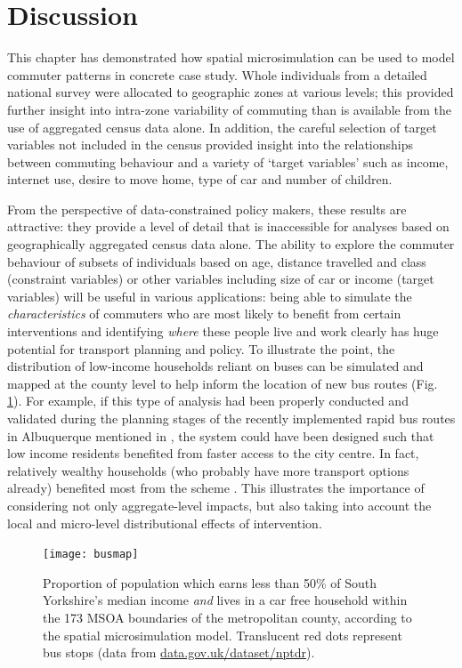 \section{Discussion}
\label{discuss-jtrg}
This chapter has demonstrated how spatial microsimulation can be
used to model commuter patterns in concrete case study.
Whole individuals from a detailed national survey were
allocated to geographic zones at various levels; this provided further insight
into intra-zone variability of commuting than is available from the use of
aggregated census data alone. In addition, the careful selection of target
variables not included in the census provided insight into the relationships
between commuting behaviour and a variety of `target variables' such as income,
internet use, desire to move home, type of car and number of children.

From the perspective of data-constrained policy makers, these results are attractive:
they provide a level of detail that is inaccessible for analyses
based on geographically aggregated census data alone. The ability
to explore the commuter behaviour of subsets of individuals based on age,
distance travelled and class (constraint variables) or other variables
including size of car or income (target variables) will be useful in
various applications:
being able to simulate the \emph{characteristics} of commuters who are most
likely to benefit from certain interventions and identifying \emph{where} these
people live and work clearly has huge potential for transport planning and policy.
To illustrate the point, the
distribution of low-income households reliant on buses can be simulated and mapped
at the county level to help inform the location of new bus routes (Fig.
\ref{fig:busmap}). For example, if this type of analysis had been properly
conducted and validated during the planning stages of the recently implemented
rapid bus routes in Albuquerque mentioned in \citet{Tribby2012},
the system could have been
designed such that low income residents benefited from faster access to the city
centre. In fact, relatively wealthy households (who probably have more transport
options already) benefited most from the scheme \citep{Tribby2012}. This
illustrates the importance of considering not only aggregate-level impacts, but
also taking into account the local and micro-level distributional effects of
intervention.

\begin{figure}[h*]
 \centering
\texttt{[image: busmap]}
 \caption[Low-income car-free families and bus-stops in South Yorkshire]
 {Proportion of population which earns less than 50\% of South
Yorkshire's median income \emph{and} lives in a car free household within the 173 MSOA
boundaries of the metropolitan county, according to the spatial
microsimulation model. Translucent red dots represent bus
stops (data from {\color{blue}\href{http://data.gov.uk/dataset/nptdr}{data.gov.uk/dataset/nptdr}}).}
 \label{fig:busmap}
\end{figure}

